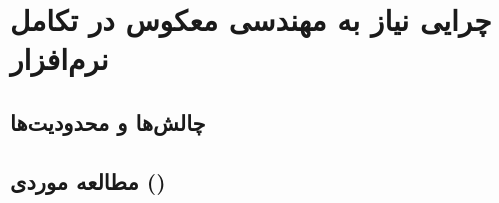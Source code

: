 \chapter{چرایی نیاز به مهندسی معکوس در تکامل نرم‌افزار}





\section{ چالش‌ها و محدودیت‌ها}
\label{sec:ch5-challengesandlimitations}


\section{مطالعه موردی ()}
\label{sec:ch5-case-study}

